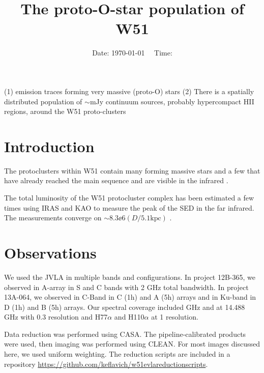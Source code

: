



\title{The proto-O-star population of W51}


\date{Date: \today ~~ Time: \currenttime}

\abstract
{}
{}
{}
{}
{
(1) \ortho \twotwo emission traces forming very massive (proto-O) stars
(2) There is a spatially distributed population of $\sim$mJy continuum sources,
probably hypercompact HII regions, around the W51 proto-clusters
}

\maketitle


\section{Introduction}

The protoclusters within W51 contain many forming massive stars
\citep{Zhang1997a,Keto2008b,Zapata2008a,Zapata2009a,Zapata2010a,Goddi2015a,Shi2010a,Shi2010b}
and a few that have already reached the main sequence and are visible in the
infrared \citep{Barbosa2008a,Figueredo2008a}.

The total luminosity of the W51 protocluster complex has been estimated a few
times using IRAS and KAO to measure the peak of the SED in the far infrared.
The measurements converge on $\sim8.3\ee{6} (D/5.1\mathrm{kpc})$ \lsun
\citep{Harvey1986a,Sievers1991a}.

\section{Observations}
We used the JVLA in multiple bands and configurations.  In project 12B-365, we
observed in A-array in S and C bands with 2 GHz total bandwidth.  In project
13A-064, we observed in C-Band in C (1h) and A (5h) arrays and in Ku-band in D
(1h) and B (5h) arrays.  Our spectral coverage included \ortho {} GHz
and \twotwo at 14.488 GHz with 0.3 \kms resolution and H77$\alpha$ and H110$\alpha$
at 1 \kms resolution.

Data reduction was performed using CASA.  The pipeline-calibrated products were
used, then imaging was performed using CLEAN.  For most images discussed here, we
used uniform weighting.  The reduction scripts are included in a repository
\url{https://github.com/keflavich/w51evlareductionscripts}.

